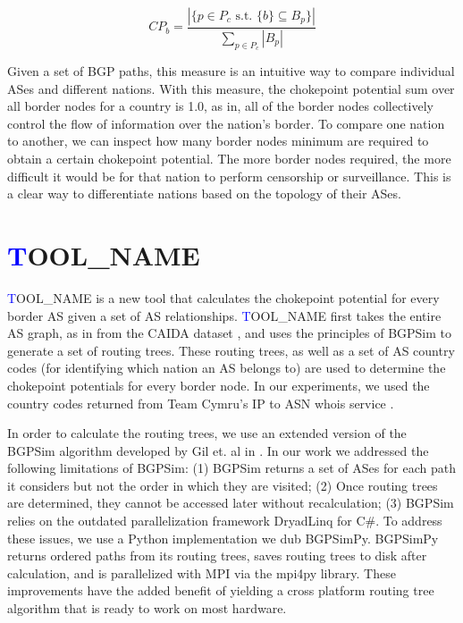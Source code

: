 \documentclass[10pt, conference, letterpaper]{IEEEtran}
\newcommand{\toolname}{{\textcolor{blue}TOOL\_NAME }}
\begin{document}
\begin{equation}\label{eqn:chokePointPotential}
CP_b = \frac{|\{p \in P_c \textrm{ s.t. } \{b\} \subseteq B_p\}|}{\sum_{p \in P_c}|B_p|}
\end{equation}

\par
Given a set of BGP paths, this measure is an intuitive way to compare individual ASes and different nations. With this measure,
the chokepoint potential sum over all border nodes for a country is 1.0, as in, all of the border nodes collectively control the
flow of information over the nation's border. To compare one nation to another, we can inspect how many border nodes minimum are required
to obtain a certain chokepoint potential. The more border nodes required, the more difficult it would be for that nation to perform
censorship or surveillance. This is a clear way to differentiate nations based on the topology of their ASes.

\section{\toolname}

\toolname is a new tool that calculates the chokepoint potential for every border AS given a set of AS relationships.
\toolname first takes the entire AS graph, as in from the CAIDA dataset \cite{CAIDA}, and uses the principles of BGPSim \cite{quicksand}
to generate a set of routing trees. These routing trees, as well as a set of AS country codes (for identifying which nation an AS belongs to)
are used to determine the chokepoint potentials for every border node. In our experiments, we used the country codes returned from Team Cymru's
IP to ASN whois service \cite{cymru}.

\par
In order to calculate the routing trees, we use an extended version of the BGPSim algorithm developed by Gil et. al in \cite{quicksand}. In
our work we addressed the following limitations of BGPSim: (1) BGPSim returns a set of ASes for each path it considers but not the order in which
they are visited; (2) Once routing trees are determined, they cannot be accessed later without recalculation; (3) BGPSim relies on the outdated parallelization
framework DryadLinq for C\#. To address these issues, we use a Python implementation we dub BGPSimPy. BGPSimPy returns ordered paths from its routing trees,
saves routing trees to disk after calculation, and is parallelized with MPI via the mpi4py library. These improvements have the added benefit of yielding a cross platform
routing tree algorithm that is ready to work on most hardware.
\end{document}

